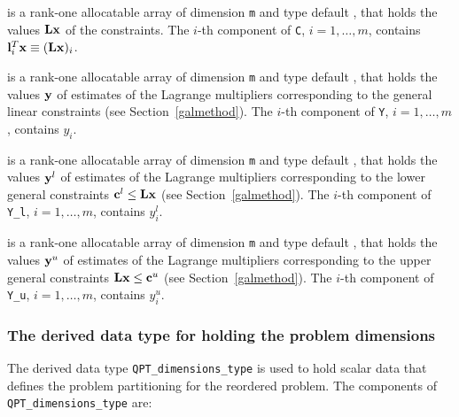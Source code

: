 \documentclass{galahad}
\begin{document}
\begin{description}
 is a rank-one allocatable array of dimension {\tt m} and type default 
\realdp, that holds
the values ${\mathbf{L}} {\mathbf{x}}$ of the constraints.
The $i$-th component of {\tt C}, $i = 1,  \ldots ,  m$, contains 
${\mathbf{l}}_{i}^{T}{\mathbf{x}} \equiv ({\mathbf{L}} {\mathbf{x}})_{i}$.  

 is a rank-one allocatable array of dimension {\tt m} and type 
default \realdp, that holds
the values ${\mathbf{y}}$ of estimates  of the Lagrange multipliers
corresponding to the general linear constraints (see Section~\ref{galmethod}).
The $i$-th component of {\tt Y}, $i = 1,  \ldots ,  m$, contains $y_{i}$.  

 is a rank-one allocatable array of dimension {\tt m} and 
type default \realdp, that holds
the values ${\mathbf{y}}^{l}$ of estimates  of the Lagrange multipliers
corresponding to the lower general constraints ${\mathbf{c}}^{l} \leq {\mathbf{L}} {\mathbf{x}}$
(see Section~\ref{galmethod}).
The $i$-th component of {\tt Y\_l}, $i = 1,  \ldots ,  m$, 
contains $y_{i}^{l}$.  

 is a rank-one allocatable array of dimension {\tt m} and 
type default \realdp, that holds
the values ${\mathbf{y}}^{u}$ of estimates  of the Lagrange multipliers
corresponding to the upper general constraints ${\mathbf{L}} {\mathbf{x}} \leq {\mathbf{c}}^{u}$
(see Section~\ref{galmethod}).
The $i$-th component of {\tt Y\_u}, $i = 1,  \ldots ,  m$, 
contains $y_{i}^{u}$.  

\end{description}



\subsubsection{The derived data type for holding the problem dimensions}
\label{typeprob}
The derived data type 
{\tt QPT\_dimensions\_type} 
is used to hold scalar data that defines the problem partitioning for the
reordered problem. 
The components of 
{\tt QPT\_dimensions\_type} 
are:
\end{document}
